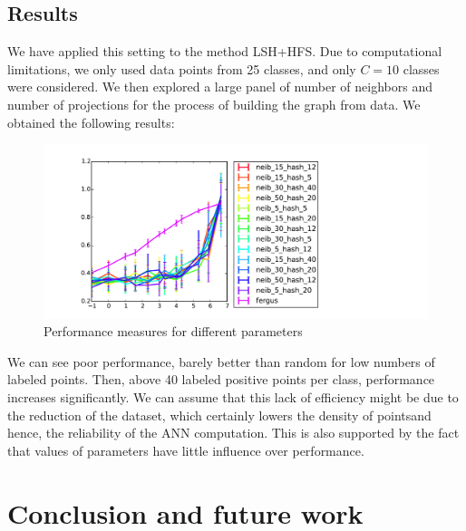 \documentclass{article} %
\begin{document}
\subsection{Results}
We have applied this setting to the method LSH+HFS. Due to computational limitations, we only used data points from 25 classes, and only $C=10$ classes were considered. We then explored a large panel of number of neighbors and number of projections for the process of building the graph from data. We obtained the following results:

\begin{figure}[!h]
\hspace{-3cm}
\includegraphics[width=1.8\textwidth]{method_comp.pdf}
\caption{Performance measures for different parameters}
\label{variation}
\end{figure}

We can see poor performance, barely better than random for low numbers of labeled points. Then, above 40 labeled positive points per class, performance increases significantly. We can assume that this lack of efficiency might be due to the reduction of the dataset, which certainly lowers the density of pointsand hence, the reliability of the ANN computation. This is also supported by the fact that values of parameters have little influence over performance.
\section{Conclusion and future work}
\end{document}
